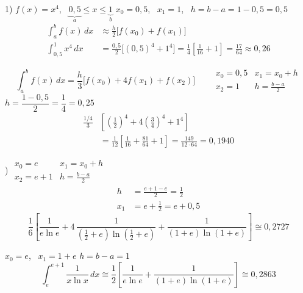 \documentclass[11pt,a4paper]{article}
\begin{document}
\begin{cozum}
1) $f(x) = x^4$, \ $\underbrace{0{,}5}_{a} \le x \le \underbrace{1}_{b}$
\hfill $x_0 = 0{,}5$, \ $x_1 = 1$, \ $h = b - a = 1 - 0{,}5 = 0{,}5$
\begin{align*}
  \int_a^b f(x)\,dx &\approx \frac{h}{2}\Big[f(x_0) + f(x_1)\Big]\\
  \int_{0{,}5}^{1} x^4\,dx &= \frac{0{,}5}{2}\Big[(0{,}5)^4 + 1^4\Big] = \frac{1}{4}\left[\frac{1}{16} + 1\right]
     = \frac{17}{64} \approx 0{,}26
\end{align*}

\[
  \int_a^b f(x)\,dx = \frac{h}{3}\Big[f(x_0) + 4f(x_1) + f(x_2)\Big]
  \qquad
  \begin{array}{ll}
    x_0 = 0{,}5 & x_1 = x_0 + h\\
    x_2 = 1 & h = \frac{b-a}{2}
  \end{array}
\]
\hfill $h = \dfrac{1 - 0{,}5}{2} = \dfrac{1}{4} = 0{,}25$ \qquad {}
\begin{align*}
  \frac{1/4}{3}&\left[\left(\frac{1}{2}\right)^4 + 4\left(\frac{3}{4}\right)^4 + 1^4\right]\\
  &= \frac{1}{12}\left[\frac{1}{16} + \frac{81}{64} + 1\right] = \frac{149}{12\cdot 64} = 0{,}1940
\end{align*}

) \quad
$\begin{array}{ll}
  x_0 = e & x_1 = x_0 + h\\
  x_2 = e + 1 & h = \frac{b-a}{2}
\end{array}$
\begin{align*}
  h &= \frac{e + 1 - e}{2} = \frac{1}{2}\\
  x_1 &= e + \frac{1}{2} = e + 0{,}5
\end{align*}
\[
  \frac{1}{6}\left[\frac{1}{e\ln e} + 4\,\frac{1}{\left(\frac{1}{2} + e\right)\ln\left(\frac{1}{2} + e\right)}
  + \frac{1}{(1+e)\ln(1+e)}\right] \cong 0{,}2727
\]
\end{cozum}

\begin{cozum}
$x_0 = e$, \ $x_1 = 1 + e$ \qquad $h = b - a = 1$
\[
  \int_e^{e+1} \frac{1}{x\ln x}\,dx \cong \frac{1}{2}\left[\frac{1}{e\ln e} + \frac{1}{(1+e)\ln(1+e)}\right] \cong 0{,}2863
\]
\end{cozum}
\end{document}
